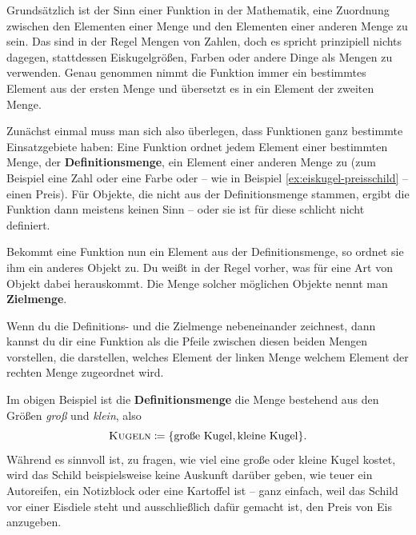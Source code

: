 \documentclass[../../main.tex]{subfiles}
\begin{document}
Grundsätzlich ist der Sinn einer Funktion in der Mathematik, eine Zuordnung zwischen den Elementen einer Menge und den Elementen einer anderen Menge zu sein. Das sind in der Regel Mengen von Zahlen, doch es spricht prinzipiell nichts dagegen, stattdessen Eiskugelgrößen, Farben oder andere Dinge als Mengen zu verwenden. Genau genommen nimmt die Funktion immer ein bestimmtes Element aus der ersten Menge und übersetzt es in ein Element der zweiten Menge.

\parpic[r]{
}
Zunächst einmal muss man sich also überlegen, dass Funktionen ganz bestimmte Einsatzgebiete haben: Eine Funktion ordnet jedem Element einer bestimmten Menge, der \textbf{Definitionsmenge}, ein Element einer anderen Menge zu (zum Beispiel eine Zahl oder eine Farbe oder -- wie in Beispiel \ref{ex:eiskugel-preisschild} -- einen Preis). Für Objekte, die nicht aus der Definitionsmenge stammen, ergibt die Funktion dann meistens keinen Sinn -- oder sie ist für diese schlicht nicht definiert.

Bekommt eine Funktion nun ein Element aus der Definitionsmenge, so ordnet sie ihm ein anderes Objekt zu. Du weißt in der Regel vorher, was für eine Art von Objekt dabei herauskommt. Die Menge solcher möglichen Objekte nennt man \textbf{Zielmenge}.

Wenn du die Definitions- und die Zielmenge nebeneinander zeichnest, dann kannst du dir eine Funktion als die Pfeile zwischen diesen beiden Mengen vorstellen, die darstellen, welches Element der linken Menge welchem Element der rechten Menge zugeordnet wird.

\begin{example}{}
    Im obigen Beispiel ist die \textbf{Definitionsmenge} die Menge bestehend aus den Größen \emph{groß} und \emph{klein}, also 
    \[\textsc{Kugeln}\coloneqq\{\text{große Kugel},\text{kleine Kugel}\}.\]
    Während es sinnvoll ist, zu fragen, wie viel eine große oder kleine Kugel kostet, wird das Schild beispielsweise keine Auskunft darüber geben, wie teuer ein Autoreifen, ein Notizblock oder eine Kartoffel ist -- ganz einfach, weil das Schild vor einer Eisdiele steht und ausschließlich dafür gemacht ist, den Preis von Eis anzugeben.
\end{example}
\end{document}
